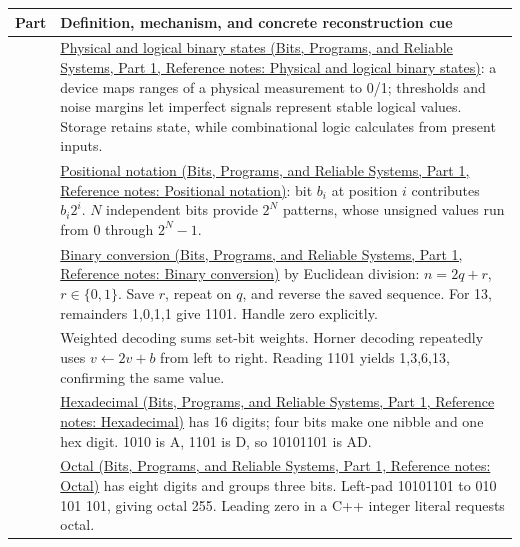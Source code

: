 {\def\LTcaptype{none} %
\begin{longtable}[]{@{}
  >{\raggedright\arraybackslash}p{}
  >{\raggedright\arraybackslash}p{}@{}}
\toprule\noalign{}
\begin{minipage}[b]{\linewidth}\raggedright
Part
\end{minipage} & \begin{minipage}[b]{\linewidth}\raggedright
Definition, mechanism, and concrete reconstruction cue
\end{minipage} \\
\midrule\noalign{}
\endhead
\bottomrule\noalign{}
\endlastfoot
1 & \href{../01-Bits-Programs-and-Reliable-Systems-P01/main.pdf\#appendix-ea798b1ceb35}{Physical and logical binary states (Bits, Programs, and Reliable Systems, Part 1, Reference notes: Physical and logical binary states)}: a device maps ranges of a physical measurement to 0/1; thresholds and noise margins let imperfect signals represent stable logical values. Storage retains state, while combinational logic calculates from present inputs. \\
2 & \href{../01-Bits-Programs-and-Reliable-Systems-P01/main.pdf\#appendix-83c3f28f7bda}{Positional notation (Bits, Programs, and Reliable Systems, Part 1, Reference notes: Positional notation)}: bit \(b_i\) at position \(i\) contributes \(b_i2^i\). \(N\) independent bits provide \(2^N\) patterns, whose unsigned values run from 0 through \(2^N-1\). \\
3 & \href{../01-Bits-Programs-and-Reliable-Systems-P01/main.pdf\#appendix-dc552784a2c0}{Binary conversion (Bits, Programs, and Reliable Systems, Part 1, Reference notes: Binary conversion)} by Euclidean division: \(n=2q+r\), \(r\in\{0,1\}\). Save \(r\), repeat on \(q\), and reverse the saved sequence. For 13, remainders 1,0,1,1 give 1101. Handle zero explicitly. \\
4 & Weighted decoding sums set-bit weights. Horner decoding repeatedly uses \(v\leftarrow2v+b\) from left to right. Reading 1101 yields 1,3,6,13, confirming the same value. \\
5 & \href{../01-Bits-Programs-and-Reliable-Systems-P01/main.pdf\#appendix-6b8075763724}{Hexadecimal (Bits, Programs, and Reliable Systems, Part 1, Reference notes: Hexadecimal)} has 16 digits; four bits make one nibble and one hex digit. 1010 is A, 1101 is D, so 10101101 is AD. \\
6 & \href{../01-Bits-Programs-and-Reliable-Systems-P01/main.pdf\#appendix-17fc1bc8b305}{Octal (Bits, Programs, and Reliable Systems, Part 1, Reference notes: Octal)} has eight digits and groups three bits. Left-pad 10101101 to 010 101 101, giving octal 255. Leading zero in a C++ integer literal requests octal. \\

\end{longtable}}

